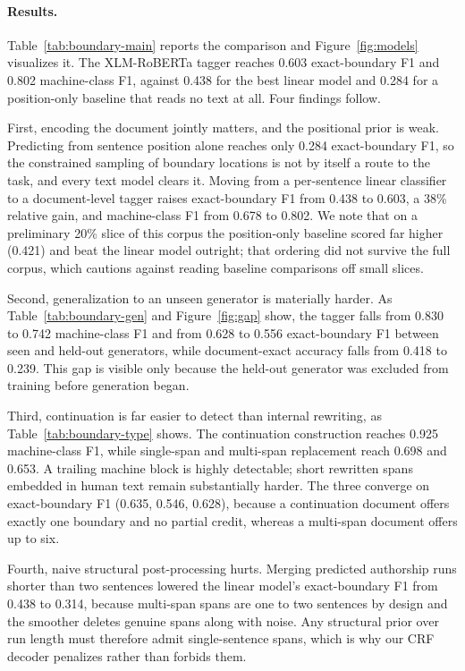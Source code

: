 \documentclass[11pt]{article}
\begin{document}
\paragraph{Results.} Table~\ref{tab:boundary-main} reports the comparison and Figure~\ref{fig:models} visualizes it. The XLM-RoBERTa tagger reaches 0.603 exact-boundary F1 and 0.802 machine-class F1, against 0.438 for the best linear model and 0.284 for a position-only baseline that reads no text at all. Four findings follow.

First, encoding the document jointly matters, and the positional prior is weak. Predicting from sentence position alone reaches only 0.284 exact-boundary F1, so the constrained sampling of boundary locations is not by itself a route to the task, and every text model clears it. Moving from a per-sentence linear classifier to a document-level tagger raises exact-boundary F1 from 0.438 to 0.603, a 38\% relative gain, and machine-class F1 from 0.678 to 0.802. We note that on a preliminary 20\% slice of this corpus the position-only baseline scored far higher (0.421) and beat the linear model outright; that ordering did not survive the full corpus, which cautions against reading baseline comparisons off small slices.

Second, generalization to an unseen generator is materially harder. As Table~\ref{tab:boundary-gen} and Figure~\ref{fig:gap} show, the tagger falls from 0.830 to 0.742 machine-class F1 and from 0.628 to 0.556 exact-boundary F1 between seen and held-out generators, while document-exact accuracy falls from 0.418 to 0.239. This gap is visible only because the held-out generator was excluded from training before generation began.

Third, continuation is far easier to detect than internal rewriting, as Table~\ref{tab:boundary-type} shows. The continuation construction reaches 0.925 machine-class F1, while single-span and multi-span replacement reach 0.698 and 0.653. A trailing machine block is highly detectable; short rewritten spans embedded in human text remain substantially harder. The three converge on exact-boundary F1 (0.635, 0.546, 0.628), because a continuation document offers exactly one boundary and no partial credit, whereas a multi-span document offers up to six.

Fourth, naive structural post-processing hurts. Merging predicted authorship runs shorter than two sentences lowered the linear model's exact-boundary F1 from 0.438 to 0.314, because multi-span spans are one to two sentences by design and the smoother deletes genuine spans along with noise. Any structural prior over run length must therefore admit single-sentence spans, which is why our CRF decoder penalizes rather than forbids them.
\end{document}
